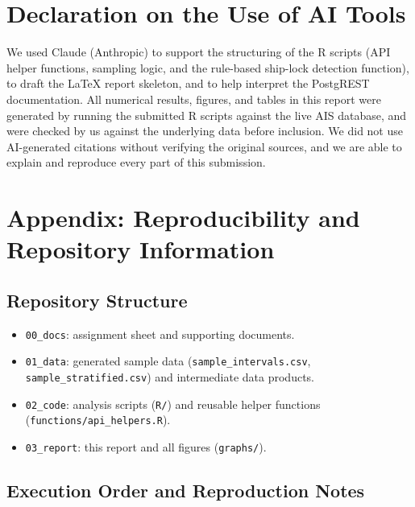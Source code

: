 \documentclass[11pt,a4paper]{article}
\begin{document}
\section{Declaration on the Use of AI Tools}
\label{sec:ai-declaration}

We used Claude (Anthropic) to support the structuring of the R scripts (API
helper functions, sampling logic, and the rule-based ship-lock detection
function), to draft the LaTeX report skeleton, and to help interpret the
PostgREST documentation. All numerical results, figures, and tables in this
report were generated by running the submitted R scripts against the live AIS
database, and were checked by us against the underlying data before inclusion.
We did not use AI-generated citations without verifying the original sources,
and we are able to explain and reproduce every part of this submission.

\printbibliography

\appendix
\section{Appendix: Reproducibility and Repository Information}

\subsection{Repository Structure}

\begin{itemize}[noitemsep]
  \item \texttt{00\_docs}: assignment sheet and supporting documents.
  \item \texttt{01\_data}: generated sample data (\texttt{sample\_intervals.csv},
        \texttt{sample\_stratified.csv}) and intermediate data products.
  \item \texttt{02\_code}: analysis scripts (\texttt{R/}) and reusable helper
        functions (\texttt{functions/api\_helpers.R}).
  \item \texttt{03\_report}: this report and all figures (\texttt{graphs/}).
\end{itemize}

\subsection{Execution Order and Reproduction Notes}
\end{document}
